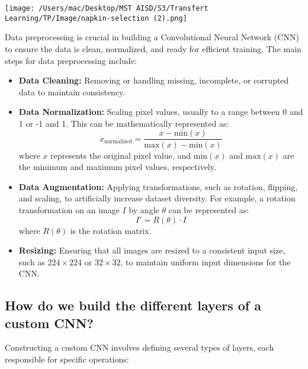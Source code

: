 \documentclass{article}
\begin{document}
\texttt{[image: /Users/mac/Desktop/MST AISD/S3/Transfert Learning/TP/Image/napkin-selection (2).png]}


Data preprocessing is crucial in building a Convolutional Neural Network (CNN) to ensure the data is clean, normalized, and ready for efficient training. The main steps for data preprocessing include:

\begin{itemize}
    \item \textbf{Data Cleaning:} Removing or handling missing, incomplete, or corrupted data to maintain consistency.
    \item \textbf{Data Normalization:} Scaling pixel values, usually to a range between 0 and 1 or -1 and 1. This can be mathematically represented as:
    \[
    x_{\text{normalized}} = \frac{x - \text{min}(x)}{\text{max}(x) - \text{min}(x)}
    \]
    where \( x \) represents the original pixel value, and \(\text{min}(x)\) and \(\text{max}(x)\) are the minimum and maximum pixel values, respectively.
    \item \textbf{Data Augmentation:} Applying transformations, such as rotation, flipping, and scaling, to artificially increase dataset diversity. For example, a rotation transformation on an image \( I \) by angle \( \theta \) can be represented as:
    \[
    I' = R(\theta) \cdot I
    \]
    where \( R(\theta) \) is the rotation matrix.
    \item \textbf{Resizing:} Ensuring that all images are resized to a consistent input size, such as \(224 \times 224\) or \(32 \times 32\), to maintain uniform input dimensions for the CNN.
\end{itemize}

\subsection{How do we build the different layers of a custom CNN?}

Constructing a custom CNN involves defining several types of layers, each responsible for specific operations:
\end{document}
